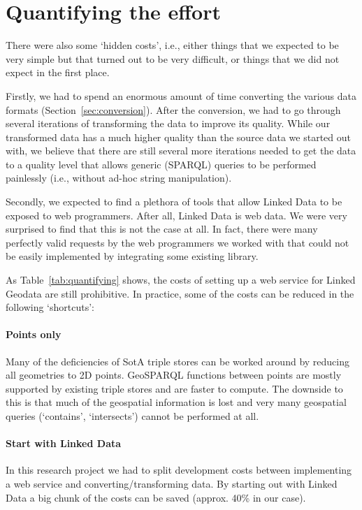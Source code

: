 \documentclass[a4paper]{scrartcl}
\begin{document}
\section{Quantifying the effort}
\label{sec:quantifying}

There were also some `hidden costs', i.e., either things that we
expected to be very simple but that turned out to be very difficult,
or things that we did not expect in the first place.

Firstly, we had to spend an enormous amount of time converting the
various data formats (Section~\ref{sec:conversion}).  After the
conversion, we had to go through several iterations of transforming
the data to improve its quality.  While our transformed data has a
much higher quality than the source data we started out with, we
believe that there are still several more iterations needed to get the
data to a quality level that allows generic (SPARQL) queries to be
performed painlessly (i.e., without ad-hoc string manipulation).

Secondly, we expected to find a plethora of tools that allow Linked
Data to be exposed to web programmers.  After all, Linked Data is web
data.  We were very surprised to find that this is not the case at
all.  In fact, there were many perfectly valid requests by the web
programmers we worked with that could not be easily implemented by
integrating some existing library.

As Table~\ref{tab:quantifying} shows, the costs of setting up a web
service for Linked Geodata are still prohibitive.  In practice, some
of the costs can be reduced in the following `shortcuts':

\paragraph{Points only}
Many of the deficiencies of SotA triple stores can be worked around by
reducing all geometries to 2D points.  GeoSPARQL functions between
points are mostly supported by existing triple stores and are faster
to compute.  The downside to this is that much of the geospatial
information is lost and very many geospatial queries (`contains',
`intersects') cannot be performed at all.

\paragraph{Start with Linked Data}
In this research project we had to split development costs between
implementing a web service and converting/transforming data.  By
starting out with Linked Data a big chunk of the costs can be saved
(approx. 40\% in our case).
\end{document}
